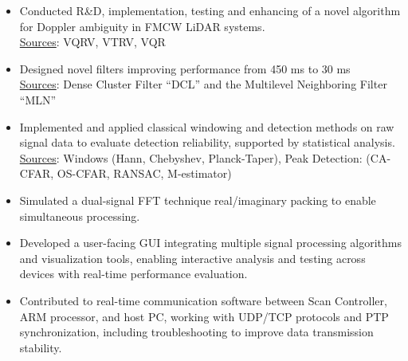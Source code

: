 \vspace{-1em}
\begin{itemize}[leftmargin=*]
  

 \item Conducted R\&D, implementation, testing and enhancing of a novel algorithm for Doppler ambiguity in FMCW LiDAR systems.
  \\ {\fontsize{10pt}{10pt}\selectfont\textcolor{blocktext2_color}{{\fontsize{10pt}{10pt}\selectfont\textcolor{blocktext2_color}{\href{https://amr-aboughazala.super.site/doppler-ambiguity-solution}{Sources}}}: VQRV, VTRV, VQR}}
  
\vspace{0.2em}
 
  \item Designed novel filters improving performance from 450 ms to 30 ms 
  \\ {\fontsize{10pt}{10pt}\selectfont\textcolor{blocktext2_color}{{\fontsize{10pt}{10pt}\selectfont\textcolor{blocktext2_color}{\href{https://amr-aboughazala.super.site/real-time-filtering}{Sources}}}: Dense Cluster Filter “DCL” and the Multilevel Neighboring Filter “MLN”}}
  
\vspace{0.2em}

 \item Implemented and applied classical windowing and detection methods on raw signal data to evaluate detection reliability, supported by statistical analysis. 
  \\ {\fontsize{10pt}{10pt}\selectfont\textcolor{blocktext2_color}{\href{https://amr-aboughazala.super.site/data-analysis}{Sources}: Windows (Hann, Chebyshev, Planck-Taper), Peak Detection: (CA-CFAR, OS-CFAR, RANSAC, M-estimator)}}
  
\vspace{0.2em}
  
  \item Simulated a dual-signal FFT technique real/imaginary packing to enable simultaneous processing.

\vspace{0.2em}  
      
  \item Developed a user-facing GUI integrating multiple signal processing algorithms and visualization tools, enabling interactive analysis and testing across devices with real-time performance evaluation.
  
  \item Contributed to real-time communication software between Scan Controller, ARM processor, and host PC, 
      working with UDP/TCP protocols and PTP synchronization, including troubleshooting to improve data transmission stability.

\end{itemize}                
                
